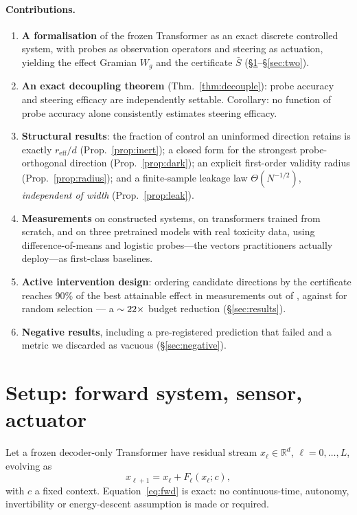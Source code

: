 \documentclass[11pt]{article}
\theoremstyle{definition}
\theoremstyle{remark}
\newcommand{\Sbar}{\bar{S}}
\newcommand{\Wg}{W_{g}}
\newcommand{\reff}{r_{\mathrm{eff}}}
\begin{document}
\paragraph{Contributions.}
\begin{enumerate}[leftmargin=1.5em,itemsep=1pt]
  \item \textbf{A formalisation} of the frozen Transformer as an exact discrete
  controlled system, with probes as observation operators and steering as
  actuation, yielding the effect Gramian $\Wg$ and the certificate $\Sbar$
  (\S\ref{sec:setup}--\S\ref{sec:two}).
  \item \textbf{An exact decoupling theorem} (Thm.~\ref{thm:decouple}): probe
  accuracy and steering efficacy are independently settable. Corollary: no
  function of probe accuracy alone consistently estimates steering efficacy.
  \item \textbf{Structural results}: the fraction of control an uninformed
  direction retains is exactly $\reff/d$ (Prop.~\ref{prop:inert}); a closed form
  for the strongest probe-orthogonal direction (Prop.~\ref{prop:dark}); an
  explicit first-order validity radius (Prop.~\ref{prop:radius}); and a
  finite-sample leakage law $\Theta(N^{-1/2})$, \emph{independent of width}
  (Prop.~\ref{prop:leak}).
  \item \textbf{Measurements} on constructed systems, on transformers trained
  from scratch, and on three pretrained models with real toxicity data, using
  difference-of-means and logistic probes---the vectors practitioners actually
  deploy---as first-class baselines.
  \item \textbf{Active intervention design}: ordering candidate directions by
  the certificate reaches 90\% of the best attainable effect in
  \EfourCertNinety{} measurements out of \EfourM{}, against \EfourRandNinety{}
  for random selection --- a $\sim22\times$ budget reduction
  (\S\ref{sec:results}).
  \item \textbf{Negative results}, including a pre-registered prediction that
  failed and a metric we discarded as vacuous (\S\ref{sec:negative}).
\end{enumerate}

\section{Setup: forward system, sensor, actuator}
\label{sec:setup}

Let a frozen decoder-only Transformer have residual stream $x_\ell\in\mathbb{R}^d$,
$\ell=0,\dots,L$, evolving as
\begin{equation}
x_{\ell+1} = x_\ell + F_\ell(x_\ell;c),
\label{eq:fwd}
\end{equation}
with $c$ a fixed context. Equation~\eqref{eq:fwd} is exact: no continuous-time,
autonomy, invertibility or energy-descent assumption is made or required.
\end{document}
